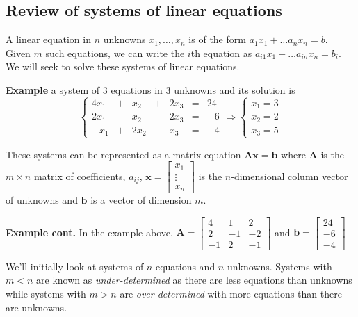 \subsection{Review of systems of linear equations}

A linear equation in $n$ unknowns $x_1, \ldots, x_n$ is of the form $a_1x_1 + \ldots a_nx_n = b$.  Given $m$ such equations, we can write the $i$th equation as $a_{i1}x_1 + \ldots a_{in}x_n = b_i$.  We will seek to solve these systems of linear equations.

{\bf Example} a system of 3 equations in 3 unknowns and its solution is 
\[ \left\{\begin{array}{rrrrrrr}
4x_1 &  + &  x_2  & + & 2x_3 & = & 24\\
2x_1 & - & x_2 & -  & 2x_3 & = & -6 \\
-x_1 & + & 2x_2 & - & x_3 & = & -4
\end{array}\right. {\Longrightarrow} \left\{\begin{array}{r}x_1=3\\x_2=2\\x_3=5\end{array}\right.\] \sqend

These systems can be represented as a matrix equation $\mathbf{Ax} = \mathbf b$ where $\mathbf A$ is the $m \times n$ matrix of coefficients, $a_{ij}$, $\mathbf{x}=\left[\begin{array}{c}x_1\\\vdots\\x_n\end{array}\right]$ is the $n$-dimensional column vector of unknowns and $\mathbf b$ is a vector of dimension $m$.

{\bf Example cont.} In the example above, $\mathbf A = \left[\begin{array}{rrr}4&1&2\\ 2 &-1& -2\\ -1 & 2 & -1\end{array}\right]$ and $\mathbf b = \left[\begin{array}{r}24 \\ -6 \\-4\end{array}\right]$ \sqend

We'll initially look at systems of $n$ equations and $n$ unknowns.  Systems  with $m < n$ are known as {\em under-determined} as there are less equations than unknowns while systems with $m > n$ are {\em over-determined} with more equations than there are unknowns.

